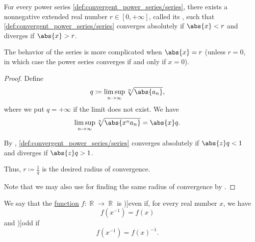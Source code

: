 \begin{theorem}\label{thm:power_series_radius_of_convergence}
  For every power series \eqref{def:convergent_power_series/series}, there exists a nonnegative extended real number \( r \in [0, +\infty] \), called its , such that \eqref{def:convergent_power_series/series} converges absolutely if \( \abs{x} < r \) and diverges if \( \abs{x} > r \).

  The behavior of the series is more complicated when \( \abs{x} = r \) (unless \( r = 0 \), in which case the power series converges if and only if \( x = 0 \)).
\end{theorem}
\begin{proof}
  Define
  \begin{equation*}
    q \coloneqq \limsup_{n \to \infty} \sqrt[n]{\abs{a_n}},
  \end{equation*}
  where we put \( q = +\infty \) if the limit does not exist. We have
  \begin{equation*}
    \limsup_{n \to \infty} \sqrt[n]{\abs{x^n a_n}} = \abs{x} q.
  \end{equation*}

  By , \eqref{def:convergent_power_series/series} converges absolutely if \( \abs{z} q < 1 \) and diverges if \( \abs{z} q > 1 \).

  Thus, \( r \coloneqq \tfrac 1 q \) is the desired radius of convergence.

  Note that we may also use  for finding the same radius of convergence by .
\end{proof}

\begin{definition}\label{def:real_function_parity}
  We say that the \hyperref[def:function]{function} \( f: \BbbR \to \BbbR \) is \term[ru=чётная (функция), en=even (function) (\cite[170]{Carothers2000})]{even} if, for every real number \( x \), we have
  \begin{equation}\label{eq:def:real_function_parity/even}
    f(x^{-1}) = f(x)
  \end{equation}
  and \term[ru=нечётная (функция), en=odd (function) (\cite[170]{Carothers2000})]{odd} if
  \begin{equation}\label{eq:def:real_function_parity/odd}
    f(x^{-1}) = f(x)^{-1}.
  \end{equation}
\end{definition}

